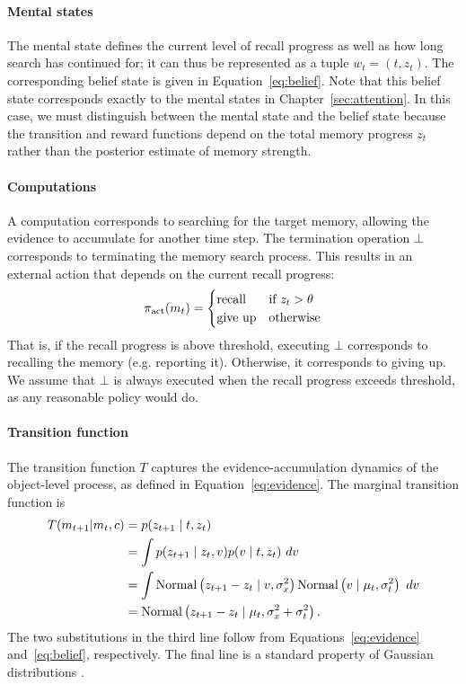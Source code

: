 \paragraph{Mental states}
The mental state defines the current level of recall progress as well as how long search has continued for; it can thus be represented as a tuple $w_t = (t, z_t)$. The corresponding belief state is given in Equation~\ref{eq:belief}. Note that this belief state corresponds exactly to the mental states in Chapter~\ref{sec:attention}. In this case, we must distinguish between the mental state and the belief state because the transition and reward functions depend on the total memory progress $z_t$ rather than the posterior estimate of memory strength.

\paragraph{Computations}
A computation corresponds to searching for the target memory, allowing the evidence to accumulate for another time step. The termination operation $\bot$ corresponds to terminating the memory search process. This results in an external action that depends on the current recall progress:
\begin{equation}
  \pi_{\text{act}}(m_t) = \begin{cases}
    \text{recall} &\text{if } z_t > \theta \\
    \text{give up} &\text{otherwise}
  \end{cases}
\end{equation}
That is, if the recall progress is above threshold, executing $\bot$ corresponds to recalling the memory (e.g. reporting it). Otherwise, it corresponds to giving up. We assume that $\bot$ is always executed when the recall progress exceeds threshold, as any reasonable policy would do.

\paragraph{Transition function}
The transition function $T$ captures the evidence-accumulation dynamics of the object-level process, as defined in Equation~\ref{eq:evidence}. The marginal transition function is
%
\begin{equation}\label{eq:transition}
\begin{aligned}
  T(m_{t+1} | m_t, c) 
  &= p(z_{t+1} \mid t, z_t) \\
  &= \int p(z_{t+1} \mid z_t, v) p(v \mid t, z_t) \ dv \\
  &= \int \mathrm{Normal}\left( z_{t+1} - z_t \mid v, \sigma_x^2 \right) 
          \mathrm{Normal}\left( v \mid \mu_t, \sigma_t^2 \right)\ dv \\
  &= \mathrm{Normal}\left( z_{t+1} - z_t \mid \mu_t, \sigma_x^2 + \sigma_t^2 \right).
\end{aligned}
\end{equation}
The two substitutions in the third line follow from Equations~\ref{eq:evidence} and~\ref{eq:belief}, respectively. The final line is a standard property of Gaussian distributions \citep{murphy2007conjugate}.

